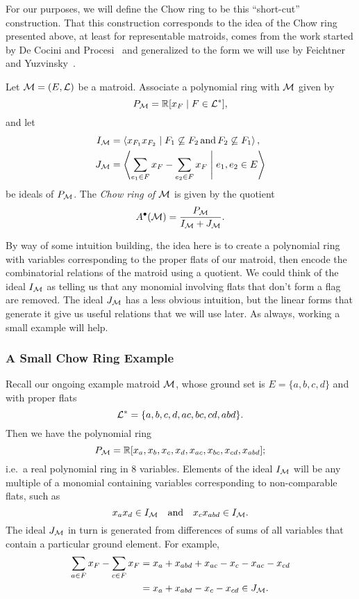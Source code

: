 \documentclass[12pt,oneside]{../../sfsuthesis}
\begin{document}
For our purposes, we will define the Chow ring to be this ``short-cut'' construction.
That this construction corresponds to the idea of the Chow ring presented above, at least for representable matroids, comes from the work started by De Cocini and Procesi~\cite{deconciniWonderfulModelsSubspace1995} and generalized to the form we will use by Feichtner and Yuzvinsky~\cite{feichtnerChowRingsToric2004}.
\begin{definition}\label{def:chowRing}
    Let \( \mathcal{M} = (E, \mathcal{L})\) be a matroid.
    Associate a polynomial ring with \( \mathcal{M} \) given by
    \[
        P_{\mathcal{M}} = \mathbb{R}[x_F \; | \; F \in \mathcal{L}^\ast],
    \]
    and let
    \begin{align*}
        I_{\mathcal{M}} & = \left\langle x_{F_1}x_{F_2} \; \middle| \; F_1 \not\subseteq F_2\, \text{and}\, F_2 \not\subseteq F_1 \right\rangle, \\
        J_{\mathcal{M}} & = \left\langle \sum_{e_1 \in F} x_{F} - \sum_{e_2 \in F} x_{F} \; \middle| \; e_1, e_2 \in E \right\rangle
    \end{align*}
    be ideals of \(P_{\mathcal{M}}\).
    The \emph{Chow ring of \( \mathcal{M} \)} is given by the quotient
    \[
        A^{\bullet}(\mathcal{M}) = \frac{P_{\mathcal{M}}}{I_{\mathcal{M}} + J_{\mathcal{M}}}.
    \]
\end{definition}

By way of some intuition building, the idea here is to create a polynomial ring with variables corresponding to the proper flats of our matroid, then encode the combinatorial relations of the matroid using a quotient.
We could think of the ideal \( I_{\mathcal{M}} \) as telling us that any monomial involving flats that don't form a flag are removed.
The ideal \( J_{\mathcal{M}} \) has a less obvious intuition, but the linear forms that generate it give us useful relations that we will use later.
As always, working a small example will help.

\subsubsection{A Small Chow Ring Example}
Recall our ongoing example matroid \( \mathcal{M} \), whose ground set is \( E = \{ a,b,c,d \} \) and with proper flats
\[
    \mathcal{L}^\ast = \{ a, b, c, d, ac, bc, cd, abd \}.
\]
Then we have the polynomial ring
\[
    P_{\mathcal{M}} = \mathbb{R}[x_{a}, x_{b}, x_{c}, x_{d}, x_{ac}, x_{bc}, x_{cd}, x_{abd}];
\]
i.e.\ a real polynomial ring in 8 variables.
Elements of the ideal \( I_{\mathcal{M}} \) will be any multiple of a monomial containing variables corresponding to non-comparable flats, such as
\[
    x_a x_d \in I_{\mathcal{M}} \quad \text{and} \quad x_c x_{abd} \in I_{\mathcal{M}}.
\]
The ideal \( J_{\mathcal{M}} \) in turn is generated from differences of sums of all variables that contain a particular ground element. For example,
\begin{align*}
    \sum_{a \in F}x_F - \sum_{c \in F}x_F & = x_a + x_{abd} + x_{ac} - x_c - x_{ac} - x_{cd} \\
                                          & = x_a + x_{abd} - x_c - x_{cd} \in J_{\mathcal{M}}.
\end{align*}
\end{document}
